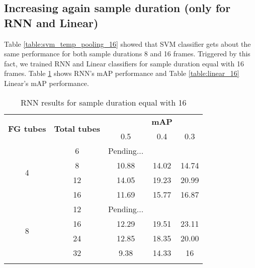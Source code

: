 \subsection{Increasing again sample duration (only for RNN and Linear)}

Table \ref{table:svm_temp_pooling_16} showed that SVM classifier gets about the same performance for both sample durations 8 and 16 frames.
Triggered by this fact, we trained RNN and Linear classifiers for sample duration equal with 16 frames. Table \ref{table:rnn_16} shows RNN's mAP
performance and Table \ref{table:linear_16} Linear's mAP performance.

\begin{center}
  \begin{longtable}{|| c | c || c c c ||}
    \hline
    \multirow{2}{*}{\textbf{FG tubes}} & \multirow{2}{*}{\textbf{Total tubes}} & {} & \textbf{mAP} & {} \\
    {} & {} & 0.5 & 0.4 & 0.3 \\
    \hline
    \multirow{4}{*}{4} & 6 & Pending...\\
    \cline{2-5}
    {} & 8 & 10.88 & 14.02 & 14.74  \\
    \cline{2-5}
    {} & 12 & 14.05 & 19.23 & 20.99 \\
    \cline{2-5}
    {} & 16 & 11.69 & 15.77 & 16.87  \\
    \hline
    \multirow{4}{*}{8} & 12 & Pending...\\
    \cline{2-5}
    {} & 16 &  12.29 & 19.51 & 23.11  \\
    \cline{2-5}
    {} & 24 & 12.85 & 18.35 & 20.00 \\
    \cline{2-5}
    {} & 32 & 9.38 & 14.33 & 16 \\
    \hline

  \caption{RNN results for sample duration equal with 16}
  \label{table:rnn_16}
\end{longtable}
\end{center}


